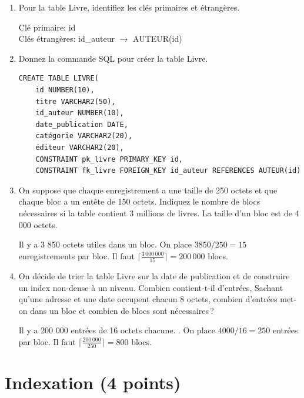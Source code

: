 \begin{enumerate}

\item Pour la table Livre, identifiez les clés primaires et étrangères.
\begin{solution}
Clé primaire: id\\
Clés étrangères: id\_auteur $\rightarrow$ AUTEUR(id)
\end{solution}

\item Donnez la commande SQL pour créer la table Livre. 
\begin{solution}
\begin{verbatim}
CREATE TABLE LIVRE(
    id NUMBER(10),
    titre VARCHAR2(50),
    id_auteur NUMBER(10),
    date_publication DATE,
    catégorie VARCHAR2(20),
    éditeur VARCHAR2(20),
    CONSTRAINT pk_livre PRIMARY_KEY id,
    CONSTRAINT fk_livre FOREIGN_KEY id_auteur REFERENCES AUTEUR(id)
\end{verbatim}
\end{solution}

\item On 
suppose que chaque enregistrement a une taille de 
250 octets et que chaque bloc a un entête de 150 octets. 
 Indiquez le nombre de blocs nécessaires si la table 
       contient 3 millions de livres. La taille d'un bloc est de 4\,000 octets.

\begin{solution}
Il y a 3 850 octets utiles dans un bloc. On place $3850/250=15$ enregistrements par bloc.  
Il faut 
        $\lceil \frac{3\,000\,000}{15} \rceil = 200\,000$ blocs.
\end{solution}

 \item On décide de trier la table Livre sur la date de publication et de construire
     un index non-dense à un niveau. Combien contient-t-il d'entrées, 
     Sachant qu'une adresse et une date occupent chacun 8 octets, combien d'entrées met-on dans
     un bloc et combien de blocs sont nécessaires\,?

\begin{solution}
Il y a 200 000 entrées de 16 octets chacune. . On place $4000/16=250$ entrées par bloc.  
Il faut 
        $\lceil \frac{200\,000}{250} \rceil = 800$ blocs.
\end{solution}

\end{enumerate}

\section{Indexation (4 points)}


